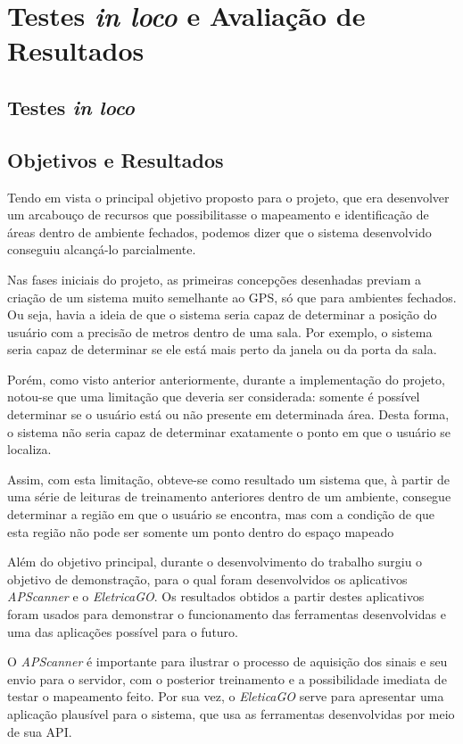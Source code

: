 \chapter{Testes \textit{in loco} e Avaliação de Resultados}

\section{Testes \textit{in loco}}

\section{Objetivos e Resultados}
Tendo em vista o principal objetivo proposto para o projeto, que era desenvolver um arcabouço de recursos que possibilitasse o mapeamento e identificação de áreas dentro de ambiente fechados, podemos dizer que o sistema desenvolvido conseguiu alcançá-lo parcialmente.\par
Nas fases iniciais do projeto, as primeiras concepções desenhadas previam a criação de um sistema muito semelhante ao GPS, só que para ambientes fechados. Ou seja, havia a ideia de que o sistema seria capaz de determinar a posição do usuário com a precisão de metros dentro de uma sala. Por exemplo, o sistema seria capaz de determinar se ele está mais perto da janela ou da porta da sala.\par
Porém, como visto anterior anteriormente, durante a implementação do projeto, notou-se que uma limitação que deveria ser considerada: somente é possível determinar se o usuário está ou não presente em determinada área. Desta forma, o sistema não seria capaz de determinar exatamente o ponto em que o usuário se localiza.\par
Assim, com esta limitação, obteve-se como resultado um sistema que, à partir de uma série de leituras de treinamento anteriores dentro de um ambiente, consegue determinar a região em que o usuário se encontra, mas com a condição de que esta região não pode ser somente um ponto dentro do espaço mapeado\par
Além do objetivo principal, durante o desenvolvimento do trabalho surgiu o objetivo de demonstração, para o qual foram desenvolvidos os aplicativos \textit{APScanner} e o \textit{EletricaGO}. Os resultados obtidos a partir destes aplicativos foram usados para demonstrar o funcionamento das ferramentas desenvolvidas e uma das aplicações possível para o futuro.\par
O \textit{APScanner} é importante para ilustrar o processo de aquisição dos sinais e seu envio para o servidor, com o posterior treinamento e a possibilidade imediata de testar o mapeamento feito. Por sua vez, o \textit{EleticaGO} serve para apresentar uma aplicação plausível para o sistema, que usa as ferramentas desenvolvidas por meio de sua API. \par
